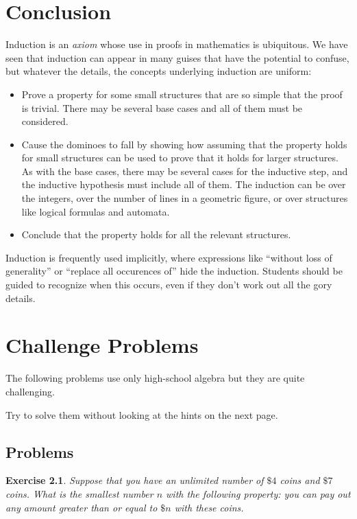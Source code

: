\documentclass[11pt,a4paper]{report}
\newtheorem{exercise}{Exercise}
\begin{document}
\chapter{Conclusion}\label{s.conclusion}

Induction is an \emph{axiom} whose use in proofs in mathematics is ubiquitous. We have seen that induction can appear in many guises that have the potential to confuse, but whatever the details, the concepts underlying induction are uniform:
\begin{itemize}
\item Prove a property for some small structures that are so simple that the proof is trivial. There may be several base cases and all of them must be considered.
\item Cause the dominoes to fall by showing how assuming that the property holds for small structures can be used to prove that it holds for larger structures. As with the base cases, there may be several cases for the inductive step, and the inductive hypothesis must include all of them. The induction can be over the integers, over the number of lines in a geometric figure, or over structures like logical formulas and automata. 
\item Conclude that the property holds for all the relevant structures.
\end{itemize}

Induction is frequently used implicitly, where expressions like ``without loss of generality'' or ``replace all occurences of'' hide the induction. Students should be guided to recognize when this occurs, even if they don't work out all the gory details.


\appendix

\chapter{Challenge Problems}\label{a.challenge}

The following problems use only high-school algebra but they are quite challenging.

Try to solve them without looking at the hints on the next page.

\section{Problems}

\begin{exercise}\label{e.coins}
Suppose that you have an unlimited number of $\$4$ coins and $\$7$ coins. What is the smallest number $n$ with the following property: you can pay out \emph{any} amount greater than or equal to $\$n$ with these coins.
\end{exercise}
\end{document}
